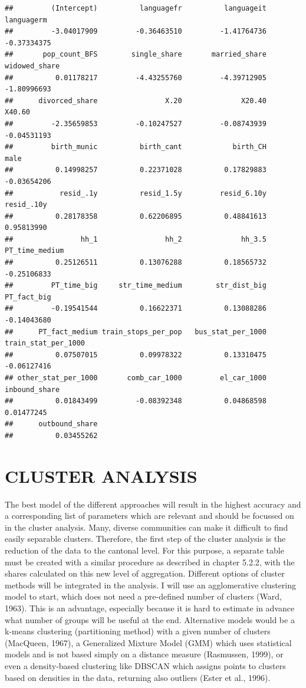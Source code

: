 \documentclass[
]{article}
\begin{document}
\begin{verbatim}
##         (Intercept)          languagefr          languageit          languagerm 
##         -3.04017909         -0.36463510         -1.41764736         -0.37334375 
##       pop_count_BFS        single_share       married_share       widowed_share 
##          0.01178217         -4.43255760         -4.39712905         -1.80996693 
##      divorced_share                X.20              X20.40              X40.60 
##         -2.35659853         -0.10247527         -0.08743939         -0.04531193 
##         birth_munic          birth_cant            birth_CH                male 
##          0.14998257          0.22371028          0.17829883         -0.03654206 
##           resid_.1y          resid_1.5y         resid_6.10y          resid_.10y 
##          0.28178358          0.62206895          0.48841613          0.95813990 
##                hh_1                hh_2              hh_3.5      PT_time_medium 
##          0.25126511          0.13076288          0.18565732         -0.25106833 
##         PT_time_big     str_time_medium        str_dist_big         PT_fact_big 
##         -0.19541544          0.16622371          0.13088286         -0.14043680 
##      PT_fact_medium train_stops_per_pop   bus_stat_per_1000 train_stat_per_1000 
##          0.07507015          0.09978322          0.13310475         -0.06127416 
## other_stat_per_1000       comb_car_1000         el_car_1000       inbound_share 
##          0.01843499         -0.08392348          0.04868598          0.01477245 
##      outbound_share 
##          0.03455262
\end{verbatim}

\hypertarget{cluster-analysis}{%
\section{CLUSTER ANALYSIS}\label{cluster-analysis}}

The best model of the different approaches will result in the highest
accuracy and a corresponding list of parameters which are relevant and
should be focussed on in the cluster analysis. Many, diverse communities
can make it difficult to find easily separable clusters. Therefore, the
first step of the cluster analysis is the reduction of the data to the
cantonal level. For this purpose, a separate table must be created with
a similar procedure as described in chapter 5.2.2, with the shares
calculated on this new level of aggregation. Different options of
cluster methods will be integrated in the analysis. I will use an
agglomerative clustering model to start, which does not need a
pre-defined number of clusters (Ward, 1963). This is an advantage,
especially because it is hard to estimate in advance what number of
groups will be useful at the end. Alternative models would be a k-means
clustering (partitioning method) with a given number of clusters
(MacQueen, 1967), a Generalized Mixture Model (GMM) which uses
statistical models and is not based simply on a distance measure
(Rasmussen, 1999), or even a density-based clustering like DBSCAN which
assigns points to clusters based on densities in the data, returning
also outliers (Ester et al., 1996).
\end{document}
